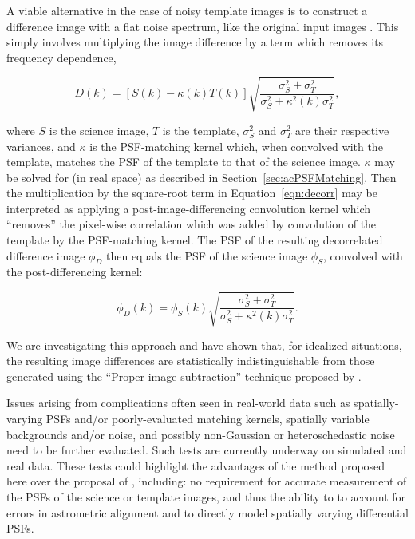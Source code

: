 A viable alternative in the case of noisy template images is to construct a difference image with a flat noise spectrum, like the original input images \citep{Kaiser04, Zackay16}. This simply involves multiplying the image difference by a term which removes its frequency dependence,

\begin{equation}
  D(k) = \left[S(k) - \kappa(k) T(k)\right]\sqrt{\frac{\sigma_S^2+\sigma_T^2}{\sigma_S^2 + \kappa^2(k)\sigma_T^2}},
  \label{eqn:decorr}
\end{equation}

\noindent
where $S$ is the science image, $T$ is the template, $\sigma_S^2$ and $\sigma_T^2$ are their respective variances, and $\kappa$ is the PSF-matching kernel which, when convolved with the template, matches the PSF of the template to that of the science image. $\kappa$ may be solved for (in real space) as described in Section~\ref{sec:acPSFMatching}. Then the multiplication by the square-root term in Equation~\ref{eqn:decorr} may be interpreted as applying a post-image-differencing convolution kernel which ``removes'' the pixel-wise correlation which was added by convolution of the template by the PSF-matching kernel. The PSF of the resulting decorrelated difference image $\phi_D$ then equals the PSF of the science image $\phi_S$, convolved with the post-differencing kernel:

\begin{equation}
  \phi_D(k) = \phi_S(k) \sqrt{\frac{\sigma_S^2+\sigma_T^2}{\sigma_S^2 + \kappa^2(k)\sigma_T^2}}.
\end{equation}

We are investigating this approach and have shown that, for idealized situations, the resulting image differences are statistically indistinguishable from those generated using the ``Proper image subtraction'' technique proposed by \cite{Zackay16}.

Issues arising from complications often seen in real-world data such as spatially-varying PSFs and/or poorly-evaluated matching kernels, spatially variable backgrounds and/or noise, and possibly non-Gaussian or heteroschedastic noise need to be further evaluated. Such tests are currently underway on simulated and real data. These tests could highlight the advantages of the method proposed here over the proposal of \cite{Zackay16}, including: no requirement for accurate measurement of the PSFs of the science or template images, and thus the ability to to account for errors in astrometric alignment and to directly model spatially varying differential PSFs.

